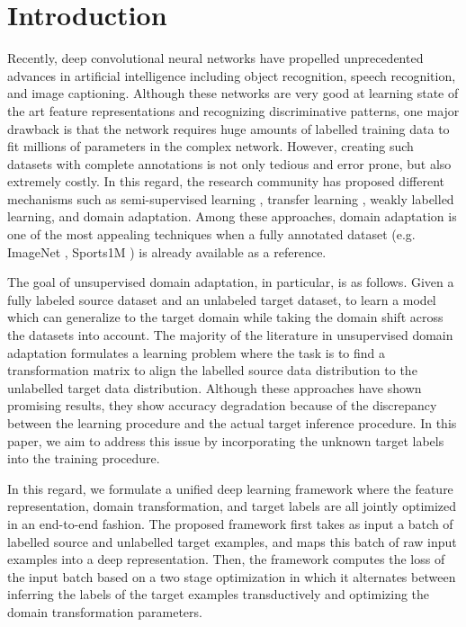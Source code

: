 \documentclass{article}
\begin{document}
\section{Introduction}
\label{intro}
Recently, deep convolutional neural networks \cite{alexnet, vggnet, googlenet} have propelled unprecedented advances in artificial intelligence including object recognition, speech recognition, and image captioning. Although these networks are very good at learning state of the art feature representations and recognizing discriminative patterns, one major drawback is that the network requires huge amounts of labelled training data to fit millions of parameters in the complex network. However, creating such datasets with complete annotations is not only tedious and error prone, but also extremely costly. In this regard, the research community has proposed different mechanisms such as semi-supervised learning \cite{semisup1,semisup2,semisup3}, transfer learning \cite{transfer1, transfer2}, weakly labelled learning, and domain adaptation. Among these approaches, domain adaptation is one of the most appealing techniques when a fully annotated dataset (e.g. ImageNet \cite{ImageNet}, Sports1M \cite{sports1m}) is already available as a reference. 

The goal of unsupervised domain adaptation, in particular, is as follows. Given a fully labeled source dataset and an unlabeled target dataset, to learn a model which can generalize to the target domain while taking the domain shift across the datasets into account. The majority of the literature \cite{gong12, baochen15, fernando13, baochen16, tommasi13} in unsupervised domain adaptation formulates a learning problem where the task is to find a transformation matrix to align the labelled source data distribution to the unlabelled target data distribution. Although these approaches have shown promising results, they show accuracy degradation because of the discrepancy between the learning procedure and the actual target inference procedure. In this paper, we aim to address this issue by incorporating the unknown target labels into the training procedure.

In this regard, we formulate a unified deep learning framework where the feature representation, domain transformation, and target labels are all jointly optimized in an end-to-end fashion. The proposed framework first takes as input a batch of labelled source and unlabelled target examples, and maps this batch of raw input examples into a deep representation. Then, the framework computes the loss of the input batch based on a two stage optimization in which it alternates between inferring the labels of the target examples transductively and optimizing the domain transformation parameters.
\end{document}
